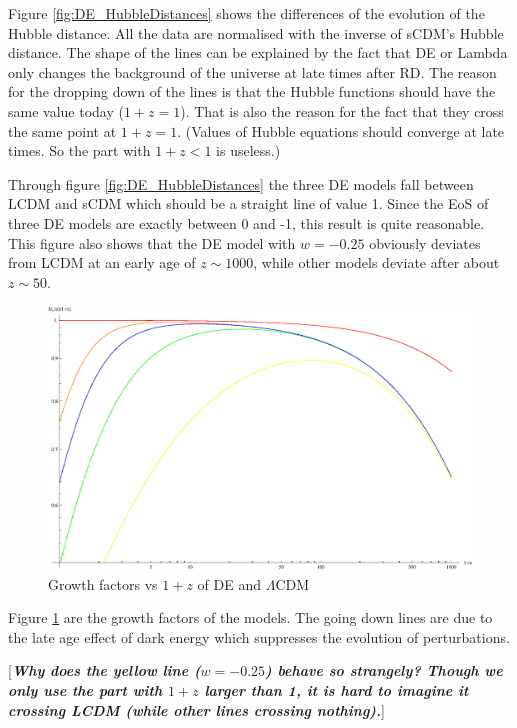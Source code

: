 \documentclass{article}
\begin{document}
Figure \ref{fig:DE_HubbleDistances} shows the differences of the evolution of the Hubble distance. All the data are normalised with the inverse of sCDM's Hubble distance.
The shape of the lines can be explained by the fact that DE or Lambda only changes the background of the universe at late times after RD. The reason for the dropping down of the lines is that the Hubble functions should have the same value today ($1+z=1$). That is also the reason for the fact that they cross the same point at $1+z=1$. (Values of Hubble equations should converge at late times. So the part with $1+z<1$ is useless.)

Through figure \ref{fig:DE_HubbleDistances} the three DE models fall between LCDM and sCDM which should be a straight line of value 1. Since the EoS of three DE models are exactly between 0 and -1, this result is quite reasonable. This figure also shows that the DE model with $w=-0.25$ obviously deviates from LCDM at an early age of $z\sim 1000$, while other models deviate after about $z\sim 50$.






\begin{figure}[!htbp]
\centering
\includegraphics[width=400pt]{DE_GrowthFactors.eps} 
\caption{Growth factors vs $1+z$ of DE and $\Lambda$CDM}\label{fig:DE_GrowthFactors}
\end{figure}


Figure \ref{fig:DE_GrowthFactors} are the growth factors of the models. The going down lines are due to the late age effect of dark energy which suppresses the evolution of perturbations.

[{\color{red}\bf \it Why does the yellow line ($w=-0.25$) behave so strangely? Though we only use the part with $1+z$ larger than 1, it is hard to imagine it crossing LCDM (while other lines crossing nothing).}]
\end{document}
